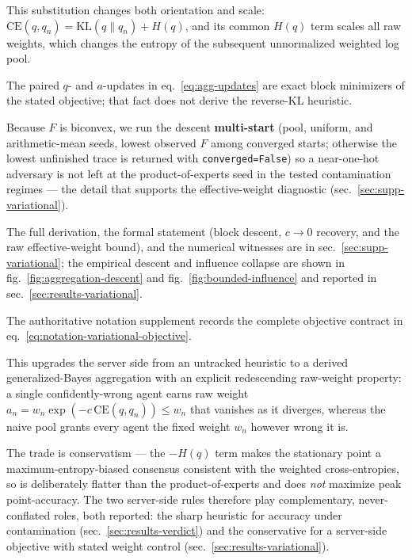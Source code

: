 \documentclass[
  english,
]{article}
\theoremstyle{plain}
\theoremstyle{definition}
\theoremstyle{remark}
\theoremstyle{definition}
\begin{document}
This substitution changes both orientation and scale:
\(\mathrm{CE}(q,q_n)=\mathrm{KL}(q\|q_n)+H(q)\), and its common \(H(q)\)
term scales all raw weights, which changes the entropy of the subsequent
unnormalized weighted log pool.

The paired \(q\)- and \(a\)-updates in eq.~\ref{eq:agg-updates} are
exact block minimizers of the stated objective; that fact does not
derive the reverse-KL heuristic.

Because \(F\) is biconvex, we run the descent \textbf{multi-start}
(pool, uniform, and arithmetic-mean seeds, lowest observed \(F\) among
converged starts; otherwise the lowest unfinished trace is returned with
\texttt{converged=False}) so a near-one-hot adversary is not left at the
product-of-experts seed in the tested contamination regimes --- the
detail that supports the effective-weight diagnostic
(sec.~\ref{sec:supp-variational}).

The full derivation, the formal statement (block descent, \(c\to0\)
recovery, and the raw effective-weight bound), and the numerical
witnesses are in sec.~\ref{sec:supp-variational}; the empirical descent
and influence collapse are shown in fig.~\ref{fig:aggregation-descent}
and fig.~\ref{fig:bounded-influence} and reported in
sec.~\ref{sec:results-variational}.

The authoritative notation supplement records the complete objective
contract in eq.~\ref{eq:notation-variational-objective}.

This upgrades the server side from an untracked heuristic to a derived
generalized-Bayes aggregation with an explicit redescending raw-weight
property: a single confidently-wrong agent earns raw weight
\(a_n = w_n\exp(-c\,\mathrm{CE}(q,q_n)) \le w_n\) that vanishes as it
diverges, whereas the naive pool grants every agent the fixed weight
\(w_n\) however wrong it is.

The trade is conservatism --- the \(-H(q)\) term makes the stationary
point a maximum-entropy-biased consensus consistent with the weighted
cross-entropies, so  is deliberately
flatter than the product-of-experts and does \emph{not} maximize peak
point-accuracy. The two server-side rules therefore play complementary,
never-conflated roles, both reported: the sharp
 heuristic for accuracy under contamination
(sec.~\ref{sec:results-verdict}) and the conservative
 for a server-side objective with stated
weight control (sec.~\ref{sec:results-variational}).
\end{document}
